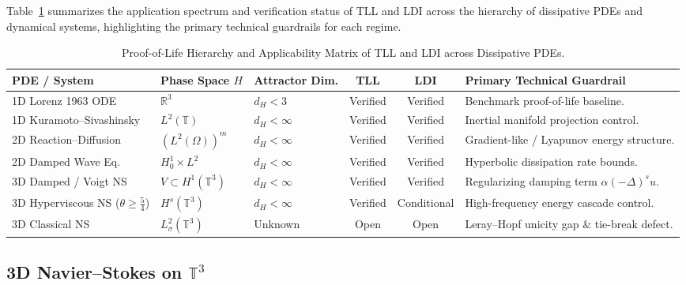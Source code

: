 \documentclass[12pt,a4paper]{article}
\theoremstyle{definition}
\theoremstyle{plain}
\theoremstyle{remark}
\begin{document}
Table~\ref{tab:pde_applications_matrix} summarizes the application spectrum and verification status of TLL and LDI across the hierarchy of dissipative PDEs and dynamical systems, highlighting the primary technical guardrails for each regime.

\begin{table}[htbp]
\centering
\caption{Proof-of-Life Hierarchy and Applicability Matrix of TLL and LDI across Dissipative PDEs.}
\label{tab:pde_applications_matrix}
\vspace{0.2cm}
\footnotesize
\begin{tabularx}{\textwidth}{p{2.8cm} p{2.0cm} p{1.6cm} c c X}
\toprule
\textbf{PDE / System} & \textbf{Phase Space $H$} & \textbf{Attractor Dim.} & \textbf{TLL} & \textbf{LDI} & \textbf{Primary Technical Guardrail} \\
\midrule
1D Lorenz 1963 ODE & $\mathbb{R}^3$ & $d_H < 3$ & Verified & Verified & Benchmark proof-of-life baseline. \\
1D Kuramoto--Sivashinsky & $L^2(\mathbb{T})$ & $d_H < \infty$ & Verified & Verified & Inertial manifold projection control. \\
2D Reaction--Diffusion & $(L^2(\Omega))^m$ & $d_H < \infty$ & Verified & Verified & Gradient-like / Lyapunov energy structure. \\
2D Damped Wave Eq. & $H^1_0 \times L^2$ & $d_H < \infty$ & Verified & Verified & Hyperbolic dissipation rate bounds. \\
3D Damped / Voigt NS & $V \subset H^1(\mathbb{T}^3)$ & $d_H < \infty$ & Verified & Verified & Regularizing damping term $\alpha (-\Delta)^s u$. \\
3D Hyperviscous NS ($\theta \ge \frac{5}{4}$) & $H^s(\mathbb{T}^3)$ & $d_H < \infty$ & Verified & Conditional & High-frequency energy cascade control. \\
3D Classical NS & $L^2_\sigma(\mathbb{T}^3)$ & Unknown & Open & Open & Leray--Hopf unicity gap \& tie-break defect. \\
\bottomrule
\end{tabularx}
\end{table}

\subsection{3D Navier--Stokes on \texorpdfstring{$\mathbb{T}^3$}{T3}}
\end{document}

